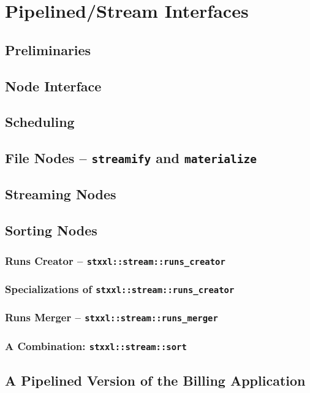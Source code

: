 \documentclass[twoside]{book}
\begin{document}
\chapter{Pipelined/Stream Interfaces}




\section{Preliminaries}
\section{Node Interface}
\section{Scheduling}
\section{File Nodes -- {\tt streamify} and {\tt materialize}}
\section{Streaming Nodes}
\section{Sorting Nodes}
\label{pipesorting}
\subsection{Runs Creator -- {\tt stxxl::stream::runs\_creator}}
\subsection{Specializations of {\tt stxxl::stream::runs\_creator}}
\subsection{Runs Merger --  {\tt stxxl::stream::runs\_merger}}
\subsection{A Combination: {\tt stxxl::stream::sort}}

\section{A Pipelined Version of the Billing Application}
\end{document}
